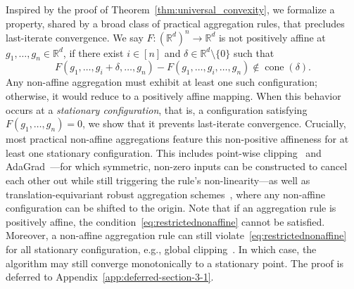 \documentclass[twoside,11pt]{article}
\newcommand{\R}{\mathbb{R}}
\begin{document}
Inspired by the proof of Theorem~\ref{thm:universal_convexity}, we formalize a property, shared by a broad class of practical aggregation rules, that precludes last-iterate convergence.
We say $F: (\mathbb{R}^d)^n \to \mathbb{R}^d$ is not positively affine at $g_1, \ldots, g_n \in \R^d$, if there exist $i \in [n]$ and $\delta \in \R^d \setminus \{0\}$ such that
\begin{equation}\label{eq:restrictednonaffine}
    F\left( g_1, \ldots, g_i + \delta, \ldots, g_n \right) - F\left( g_1, \ldots, g_i, \ldots,  g_n \right)  \not \in \operatorname{cone}(\delta).
\end{equation}
Any non-affine aggregation must exhibit at least one such configuration; otherwise, it would reduce to a positively affine mapping. 
When this behavior occurs at a \emph{stationary configuration}, that is, a configuration satisfying $F(g_1, \ldots, g_n) = 0$, we show that it prevents last-iterate convergence. 
Crucially, most practical non-affine aggregations feature this non-positive affineness for at least one stationary configuration. 
This includes point-wise clipping~\citep{Abadi_2016} and AdaGrad~\citep{duchi2011adaptive}---for which symmetric, non-zero inputs can be constructed to cancel each other out while still triggering the rule's non-linearity---as well as translation-equivariant robust aggregation schemes~\citep{pmlr-v202-allouah23a, Diakonikolas_Kane_2023}, where any non-affine configuration can be shifted to the origin.
Note that if an aggregation rule is positively affine, the condition~\eqref{eq:restrictednonaffine} cannot be satisfied. 
Moreover, a non-affine aggregation rule can still violate~\eqref{eq:restrictednonaffine} for all stationary configuration, e.g., global clipping~\citep[Theorem 2.3]{koloskova2023revisitingclipping}. 
In which case, the algorithm may still converge monotonically to a stationary point. 
The proof is deferred to Appendix~\ref{app:deferred-section-3-1}.
\end{document}
